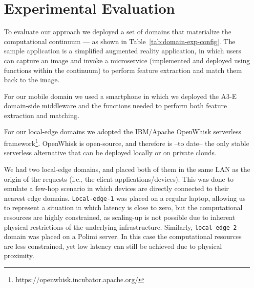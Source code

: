\section{Experimental Evaluation}\label{sec:evaluation}



To evaluate our approach we deployed a set of domains that materialize the computational continuum --- as shown in Table~\ref{tab:domain-exp-config}. The sample application is a simplified augmented reality application, in which users can capture an image and invoke a microservice (implemented and deployed using functions within the continuum) to perform feature extraction and match them back to the image. 

For our mobile domain we used a smartphone in which we deployed the A3-E domain-side middleware and the functions needed to perform both feature extraction and matching. 

For our local-edge domains we adopted the IBM/Apache OpenWhisk serverless framework\footnote{https://openwhisk.incubator.apache.org/}. OpenWhisk is open-source, and therefore is --to date-- the only stable serverless alternative that can be deployed locally or on private clouds. 


We had two local-edge domains, and placed both of them in the same LAN as the origin of the requests (i.e., the client applications/devices). This was done to emulate a few-hop scenario in which devices are directly connected to their nearest edge domains. \texttt{Local-edge-1} was placed on a regular laptop, allowing us to represent a situation in which latency is close to zero, but the computational resources are highly constrained, as scaling-up is not possible due to inherent physical restrictions of the underlying infrastructure. Similarly, \texttt{local-edge-2} domain was placed on a Polimi server. In this case the computational resources are less constrained, yet low latency can still be achieved due to physical proximity.


